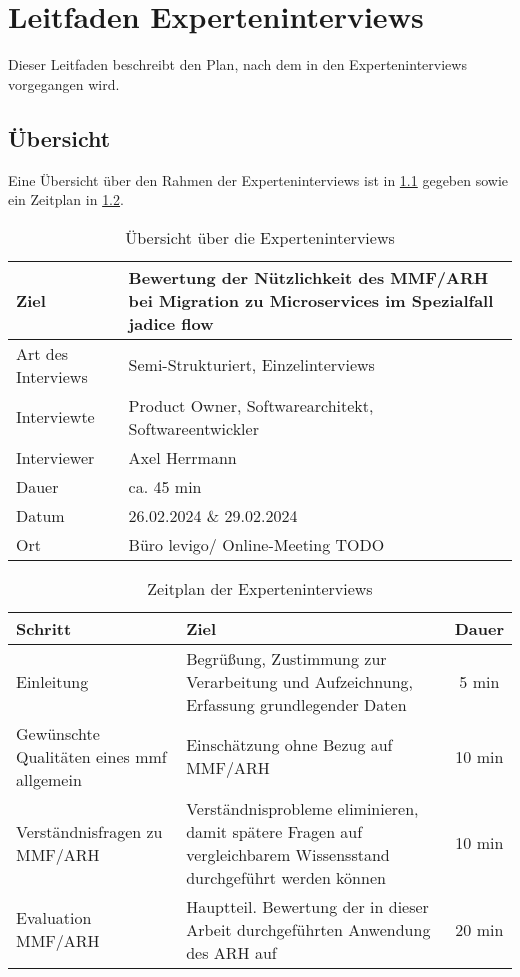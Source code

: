 \chapter{Leitfaden Experteninterviews}
\label{chap:expert-interviews-leitfaden}

Dieser Leitfaden beschreibt den Plan, nach dem in den Experteninterviews vorgegangen wird.

\section{Übersicht}

Eine Übersicht über den Rahmen der Experteninterviews ist in \cref{tab:expert-interviews-übersicht} gegeben sowie ein Zeitplan in \cref{tab:expert-interviews-zeitplan}.

\begin{table}[!ht]
  \centering
  \begin{tabular}{|l | p{9cm}|}
    \hline
    Ziel & Bewertung der Nützlichkeit des MMF/ARH bei Migration zu Microservices im Spezialfall jadice flow \\ \hline
    Art des Interviews & Semi-Strukturiert, Einzelinterviews \\ \hline
    Interviewte & Product Owner, Softwarearchitekt, Softwareentwickler \\ \hline
    Interviewer & Axel Herrmann \\ \hline
    Dauer &ca. 45 min \\ \hline
    Datum & 26.02.2024 \& 29.02.2024 \\ \hline
    Ort & Büro levigo/ Online-Meeting TODO \\ \hline
  \end{tabular}
  \caption[Übersicht Experteninterviews]{
    Übersicht über die Experteninterviews
  }
  \label{tab:expert-interviews-übersicht}
\end{table}

\begin{table}[!ht]
	\centering
	\begin{tabular}{m{4.1cm} m{8cm} c}
		\toprule
		\textbf{Schritt} & \textbf{Ziel} & \textbf{Dauer} \\ \midrule
		Einleitung & Begrüßung, Zustimmung zur Verarbeitung und Auf\-zeich\-nung, Erfassung grundlegender Daten & 5 min \\
		Gewünschte Qualitäten ei\-nes \gls{mmf} allgemein & Einschätzung ohne Bezug auf MMF/ARH & 10 min \\
		Verständnisfragen zu MMF/\-ARH & Verständnisprobleme eliminieren, damit spätere Fra\-gen auf vergleichbarem Wissensstand durchgeführt werden können & 10 min \\
		Evaluation MMF/ARH & Hauptteil. Bewertung der in dieser Arbeit durch\-ge\-führ\-ten Anwendung des ARH auf \jf & 20 min \\
		\bottomrule
	\end{tabular}
	\caption[Zeitplan Experteninterviews]{
		Zeitplan der Experteninterviews
	}
	\label{tab:expert-interviews-zeitplan}
\end{table}



